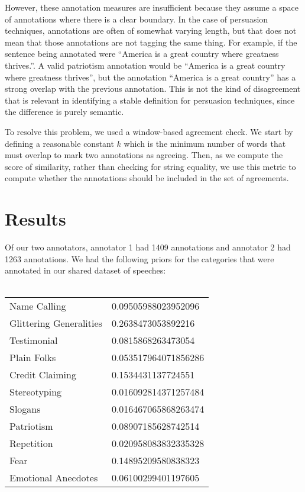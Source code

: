 \documentclass[letterpaper]{article}
\begin{document}
However, these annotation measures are insufficient because they assume a space of annotations where there is a clear boundary. In the case of persuasion techniques, annotations are often of somewhat varying length, but that does not mean that those annotations are not tagging the same thing. For example, if the sentence being annotated were ``America is a great country where greatness thrives.''. A valid patriotism annotation would be ``America is a great country where greatness thrives'', but the annotation ``America is a great country'' has a strong overlap with the previous annotation. This is not the kind of disagreement that is relevant in identifying a stable definition for persuasion techniques, since the difference is purely semantic.

To resolve this problem, we used a window-based agreement check. We start by defining a reasonable constant $k$ which is the minimum number of words that must overlap to mark two annotations as agreeing. Then, as we compute the score of similarity, rather than checking for string equality, we use this metric to compute whether the annotations should be included in the set of agreements.
\section{Results}
Of our two annotators, annotator 1 had 1409 annotations and annotator 2 had 1263 annotations. We had the following priors for the categories that were annotated in our shared dataset of speeches: \\ \\
\begin{tabular}{| l | l |}
\hline
 Name Calling & 0.09505988023952096 \\ 
 Glittering Generalities & 0.2638473053892216 \\  
 Testimonial & 0.0815868263473054 \\
 Plain Folks & 0.053517964071856286 \\
 Credit Claiming & 0.1534431137724551 \\
 Stereotyping & 0.016092814371257484 \\
 Slogans & 0.016467065868263474 \\
 Patriotism & 0.08907185628742514 \\
 Repetition & 0.020958083832335328 \\
 Fear & 0.14895209580838323 \\
 Emotional Anecdotes & 0.06100299401197605 \\
 \hline
\end{tabular}\\ \\
\end{document}

